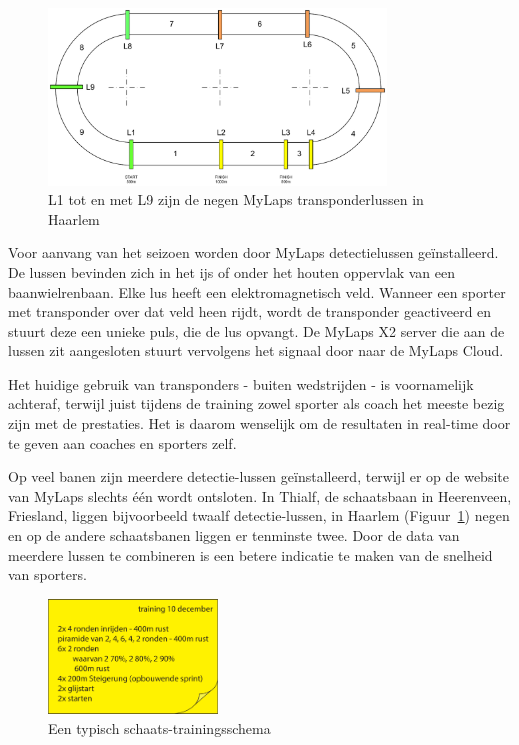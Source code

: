 \begin{figure}
  \begin{center}
    \includegraphics[width=0.8\textwidth]{style/images/BaanoverzichtHaarlem}
  \end{center}
  \caption{L1 tot en met L9 zijn de negen MyLaps transponderlussen in Haarlem}
  \label{fig:track-transponders}
\end{figure}

Voor aanvang van het seizoen worden door MyLaps detectielussen geïnstalleerd. De lussen bevinden zich in het ijs of onder het houten oppervlak van een baanwielrenbaan. Elke lus heeft een elektromagnetisch veld. Wanneer een sporter met transponder over dat veld heen rijdt, wordt de transponder geactiveerd en stuurt deze een unieke puls, die de lus opvangt. De MyLaps X2 server die aan de lussen zit aangesloten stuurt vervolgens het signaal door naar de MyLaps Cloud.

Het huidige gebruik van transponders - buiten wedstrijden - is voornamelijk achteraf, terwijl juist tijdens de training zowel sporter als coach het meeste bezig zijn met de prestaties. Het is daarom wenselijk om de resultaten in real-time door te geven aan coaches en sporters zelf.

Op veel banen zijn meerdere detectie-lussen geïnstalleerd, terwijl er op de website van MyLaps slechts één wordt ontsloten. In Thialf, de schaatsbaan in Heerenveen, Friesland, liggen bijvoorbeeld twaalf detectie-lussen, in Haarlem (Figuur~\ref{fig:track-transponders}) negen en op de andere schaatsbanen liggen er tenminste twee. Door de data van meerdere lussen te combineren is een betere indicatie te maken van de snelheid van sporters.

\begin{figure}
 \includegraphics[width=0.4\textwidth]{style/images/training}
 \caption{Een typisch schaats-trainingsschema}
\end{figure}

